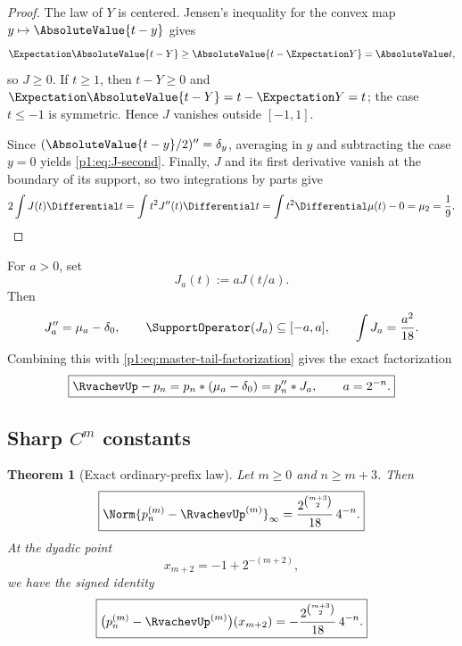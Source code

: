 \documentclass[11pt]{article}
\numberwithin{equation}{section}
\newtheorem{theorem}{Theorem}[section]
\theoremstyle{definition}
\theoremstyle{remark}
\begin{document}
\begin{proof}
The law of $Y$ is centered.  Jensen's inequality for the convex map $y\mapsto\AbsoluteValue{t-y}$ gives
\[
 \Expectation\AbsoluteValue{t-Y}\ge\AbsoluteValue{t-\Expectation Y}=\AbsoluteValue t,
\]
so $J\ge0$.  If $t\ge1$, then $t-Y\ge0$ and
\(\Expectation\AbsoluteValue{t-Y}=t-\Expectation Y=t\); the case $t\le-1$ is symmetric.  Hence $J$ vanishes outside $[-1,1]$.

Since \((\AbsoluteValue{t-y}/2)''=\delta_y\), averaging in $y$ and subtracting the case $y=0$ yields \eqref{p1:eq:J-second}.  Finally, $J$ and its first derivative vanish at the boundary of its support, so two integrations by parts give
\[
 2\int J(t)\Differential t
 =\int t^2J''(t)\Differential t
 =\int t^2\Differential\mu(t)-0
 =\mu_2=\frac19.
\]
\end{proof}

For $a>0$, set
\begin{equation}
 J_a(t):=aJ(t/a).
 \label{p1:eq:Ja}
\end{equation}
Then
\begin{equation}
 J_a''=\mu_a-\delta_0,
 \qquad
 \SupportOperator(J_a)\subseteq[-a,a],
 \qquad
 \int J_a=\frac{a^2}{18}.
 \label{p1:eq:Ja-properties}
\end{equation}
Combining this with \eqref{p1:eq:master-tail-factorization} gives the exact factorization
\begin{equation}
 \boxed{\RvachevUp-p_n=p_n*(\mu_a-\delta_0)=p_n''*J_a,\qquad a=2^{-n}.}
 \label{p1:eq:ordinary-factorization}
\end{equation}

\subsection{Sharp $C^m$ constants}

\begin{theorem}[Exact ordinary-prefix law]
\label{p1:thm:ordinary-exact}
Let $m\ge0$ and $n\ge m+3$.  Then
\begin{equation}
 \boxed{
 \Norm{p_n^{(m)}-\RvachevUp^{(m)}}_\infty
 =\frac{2^{\binom{m+3}{2}}}{18}\,4^{-n}.}
 \label{p1:eq:ordinary-exact}
\end{equation}
At the dyadic point
\begin{equation}
 x_{m+2}=-1+2^{-(m+2)},
 \label{p1:eq:ordinary-extremal-point}
\end{equation}
we have the signed identity
\begin{equation}
 \boxed{
 \bigl(p_n^{(m)}-\RvachevUp^{(m)}\bigr)(x_{m+2})
 =-\frac{2^{\binom{m+3}{2}}}{18}\,4^{-n}.}
 \label{p1:eq:ordinary-signed}
\end{equation}
\end{theorem}
\end{document}
